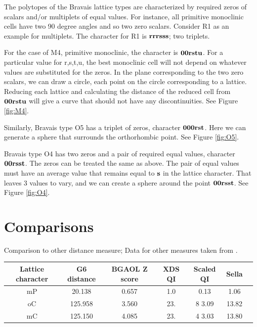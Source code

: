 \documentclass[preprint]{iucr}              %
\begin{document}
The polytopes of the Bravais lattice types are characterized by required zeros
of scalars and/or multiplets of equal values. For instance, all primitive 
monoclinic cells have two 90 degree angles and so two zero scalars. Consider R1 as
an example for multiplets. The character for R1 is $ \bf{rrr sss} $; two triplets.

For the case of M4, primitive monoclinic, the character is $ \bf{00r stu} $. 
For a particular value for r,s,t,u, the best monoclinic cell will not
depend on whatever values are substituted for the zeros. In the plane
corresponding to the two zero scalars, we can draw a circle, each point
on the circle corresponding to a lattice. Reducing each lattice and calculating
the distance of the reduced cell from $ \bf{00r stu} $ will give a curve that
should not have any discontinuities. See Figure \ref{fig:M4}. 

Similarly, Bravais type O5 has a triplet of zeros, character $ \bf{000 rst} $. Here we
can generate a sphere that surrounds the orthorhombic point. See Figure \ref{fig:O5}.

Bravais type O4 has two zeros and a pair of required equal values, 
character $ \bf{00r sst} $. The zeros can be treated the same as above. 
The pair of equal values must 
have an average value that remains equal to $\bf{s}$ in the lattice character. 
That leaves 3 values to vary, and we can create a sphere around 
the point $ \bf{00r sst} $. See Figure \ref{fig:O4}.



\section{Comparisons}

Comparison to other distance measure; Data for other measures taken
from .

\begin{tabular}{ccccccc}
	\toprule
	Lattice character&G6 distance  &BGAOL   Z score&XDS QI &Scaled QI &Sella\\	
	\midrule
			mP               &     20.138  & 0.657    &   1.0  & 0.13  & 1.06\\	
			oC               &     125.958 &  3.560   &    23. & 8 3.09& 13.82\\	
			mC               &     125.150 &  4.085   &    23. & 4 3.03& 13.80\\	
	\bottomrule
\end{tabular}

~\\
\end{document}
